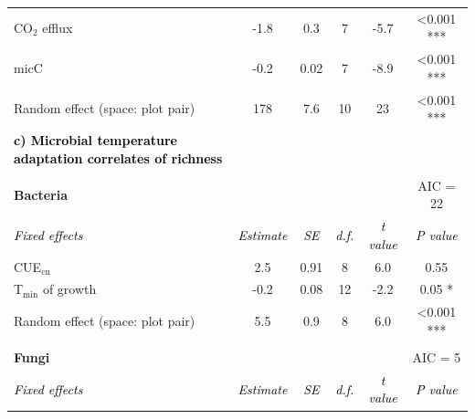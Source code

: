 \documentclass[
  letterpaper,
  DIV=11,
  numbers=noendperiod]{scrartcl}
\begin{document}
\begin{table}[H]
\begin{tabular}[t]{lccccc}
\midrule
\hspace{1em}\hspace{1em}CO$_{2}$ efflux & -1.8 & 0.3 & 7 & -5.7 & <0.001 ***\\
\hspace{1em}\hspace{1em}micC & -0.2 & 0.02 & 7 & -8.9 & <0.001 ***\\
\midrule
\hspace{1em}Random effect (space: plot pair) & 178 & 7.6 & 10 & 23 & <0.001 ***\\
\midrule
\begingroup\fontsize{9}{11}\selectfont \textcolor{black}{\textbf{c) Microbial temperature adaptation correlates of richness}}\endgroup & \begingroup\fontsize{9}{11}\selectfont \textcolor{black}{\textbf{}}\endgroup & \begingroup\fontsize{9}{11}\selectfont \textcolor{black}{\textbf{}}\endgroup & \begingroup\fontsize{9}{11}\selectfont \textcolor{black}{\textbf{}}\endgroup & \begingroup\fontsize{9}{11}\selectfont \textcolor{black}{\textbf{}}\endgroup & \begingroup\fontsize{9}{11}\selectfont \textcolor{black}{\textbf{}}\endgroup\\
\addlinespace[-0.8em]
\multicolumn{6}{l}{\textbf{}}\\
\hspace{1em}\textbf{Bacteria} &  &  &  &  & AIC = 22\\
\midrule
\textcolor{black}{\em{\hspace{1em}Fixed effects}} & \textcolor{black}{\em{Estimate}} & \textcolor{black}{\em{SE}} & \textcolor{black}{\em{d.f.}} & \textcolor{black}{\em{t value}} & \textcolor{black}{\em{P \vphantom{1} value}}\\
\midrule
\hspace{1em}\hspace{1em}CUE$_{\mathrm{cn}}$ & 2.5 & 0.91 & 8 & 6.0 & 0.55\\
\hspace{1em}\hspace{1em}T$_{\mathrm{min}}$ of growth & -0.2 & 0.08 & 12 & -2.2 & 0.05 *\\
\midrule
\hspace{1em}Random effect (space: plot pair) & 5.5 & 0.9 & 8 & 6.0 & <0.001 ***\\
\midrule
\addlinespace[-1em]
\multicolumn{6}{l}{\textbf{}}\\
\hspace{1em}\textbf{Fungi} &  &  &  &  & AIC = 5\\
\midrule
\textcolor{black}{\em{\hspace{1em}Fixed effects}} & \textcolor{black}{\em{Estimate}} & \textcolor{black}{\em{SE}} & \textcolor{black}{\em{d.f.}} & \textcolor{black}{\em{t value}} & \textcolor{black}{\em{P value}}\\

\end{tabular}
\end{table}
\end{document}
